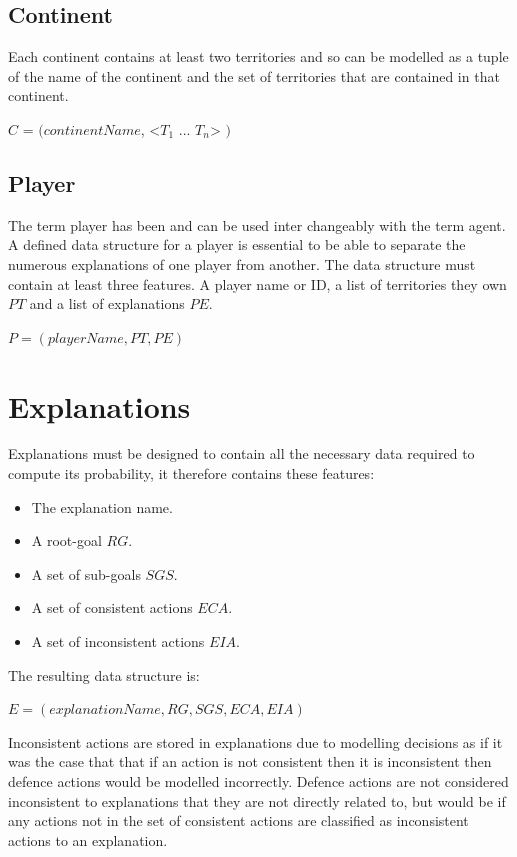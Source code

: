 \documentclass[parskip]{cs4rep}
\begin{document}
\subsection{Continent}

Each continent contains at least two territories and so can be modelled as a tuple of the name of the continent and the set of territories that are contained in that continent.

\centerline{
$C$ = $( continentName$, <$T_{1}$ ... $T_{n}$> $)$
}

\subsection{Player}

The term player has been and can be used inter changeably with the term agent. A defined data structure for a player is essential to be able to separate the numerous explanations of one player from another. The data structure must contain at least three features. A player name or ID, a list of territories they own $PT$ and a list of explanations $PE$.\newline

\centerline{
$P = ( playerName, PT, PE )$
}

\section{Explanations}

Explanations must be designed to contain all the necessary data required to compute its probability, it therefore contains these features:

\begin{itemize}
\item
The explanation name.
\item
A root-goal $RG$.
\item
A set of sub-goals $SGS$.
\item
A set of consistent actions $ECA$.
\item
A set of inconsistent actions $EIA$.
\end{itemize}

The resulting data structure is:\newline

\centerline{
$E = ( explanationName, RG, SGS, ECA, EIA )$
}

Inconsistent actions are stored in explanations due to modelling decisions as if it was the case that that if an action is not consistent then it is inconsistent then defence actions would be modelled incorrectly. Defence actions are not considered inconsistent to explanations that they are not directly related to, but would be if any actions not in the set of consistent actions are classified as inconsistent actions to an explanation.
\end{document}
